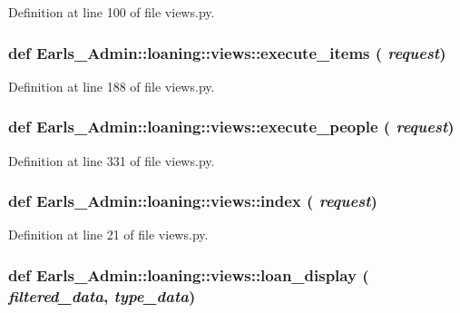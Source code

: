 Definition at line 100 of file views.py.\hypertarget{namespaceEarls__Admin_1_1loaning_1_1views_cb2865c2206914bb39cd0c831a83c811}{
\subsubsection[execute\_\-items]{\setlength{\rightskip}{0pt plus 5cm}def Earls\_\-Admin::loaning::views::execute\_\-items ( {\em request})}}
\label{namespaceEarls__Admin_1_1loaning_1_1views_cb2865c2206914bb39cd0c831a83c811}




Definition at line 188 of file views.py.\hypertarget{namespaceEarls__Admin_1_1loaning_1_1views_0892caccb7ff366c7a4ca2b0955fc848}{
\subsubsection[execute\_\-people]{\setlength{\rightskip}{0pt plus 5cm}def Earls\_\-Admin::loaning::views::execute\_\-people ( {\em request})}}
\label{namespaceEarls__Admin_1_1loaning_1_1views_0892caccb7ff366c7a4ca2b0955fc848}




Definition at line 331 of file views.py.\hypertarget{namespaceEarls__Admin_1_1loaning_1_1views_a64c7a946718a1d28dd4ec76602b1cf0}{
\subsubsection[index]{\setlength{\rightskip}{0pt plus 5cm}def Earls\_\-Admin::loaning::views::index ( {\em request})}}
\label{namespaceEarls__Admin_1_1loaning_1_1views_a64c7a946718a1d28dd4ec76602b1cf0}




Definition at line 21 of file views.py.\hypertarget{namespaceEarls__Admin_1_1loaning_1_1views_3b2efb16aecb311fce49b4ff76a98a9d}{
\subsubsection[loan\_\-display]{\setlength{\rightskip}{0pt plus 5cm}def Earls\_\-Admin::loaning::views::loan\_\-display ( {\em filtered\_\-data}, \/   {\em type\_\-data})}}
\label{namespaceEarls__Admin_1_1loaning_1_1views_3b2efb16aecb311fce49b4ff76a98a9d}




